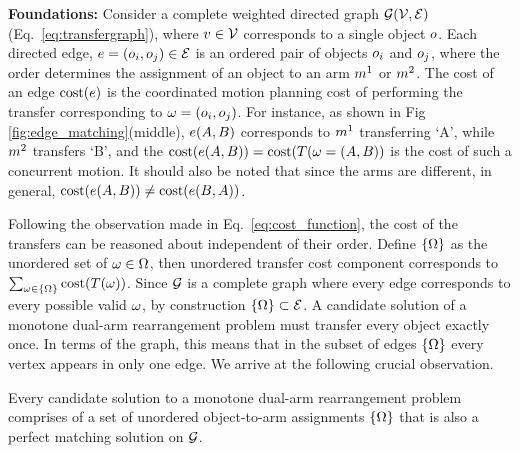 \noindent\textbf{Foundations:} Consider a complete weighted directed graph $\mathcal{G}(\mathcal{V},\mathcal{E})$ (Eq.~\ref{eq:transfergraph}), where ${v} \in \mathcal{V}$ corresponds to a single object $ o $. Each directed edge, ${e}=(o_i,o_j) \in \mathcal{E}$ is an ordered pair of objects $ o_i $ and $o_j $, where the order determines the assignment of an object to an arm $ m^1 $ or $ m^2 $. The cost of an edge $ \textup{cost}({e}) $ is the coordinated motion planning cost of performing the transfer corresponding to $ {\omega} = (o_i,o_j) $. For instance, as shown in Fig \ref{fig:edge_matching}(middle), ${e}(A,B)$ corresponds to $ m^1 $ transferring `A', while $ m^2 $ transfers `B', and the $\textup{cost}( {e}(A,B) ) = \textup{cost}(T({\omega}=(A,B))$ is the cost of such a concurrent motion. 
It should also be noted that since the arms are different, in general, $\textup{cost}( {e}(A,B) ) \neq \textup{cost}( {e}(B,A) )$.



Following the observation made in Eq.~\ref{eq:cost_function}, the cost of the transfers can be reasoned about independent of their order. 
Define $\{{{\Omega}}\}$ as the unordered set of ${\omega}\in{{\Omega}}$, then unordered transfer cost component corresponds to $\sum_{{\omega}\in\{{{\Omega}}\}}\textup{cost}(T({\omega}))$.
Since $ \mathcal{G} $ is a complete graph where every edge corresponds to every possible valid $ {\omega} $, by construction $ \{{{\Omega}}\} \subset \mathcal{E}$. A candidate solution of a monotone dual-arm rearrangement problem must transfer every object exactly once. In terms of the graph, this means that in the subset of edges $ \{{{\Omega}}\} $ every vertex appears in only one edge. We arrive at the following crucial observation.


\vspace{-0.13in}
{
Every candidate solution to a monotone dual-arm rearrangement problem comprises of a set of unordered object-to-arm assignments $ \{{{\Omega}}\} $ that is also a perfect matching solution on $ \mathcal{G} $.
}

